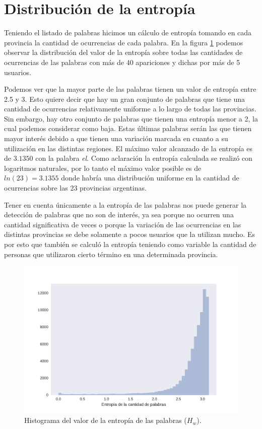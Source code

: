 \section{Distribución de la entropía}
Teniendo el listado de palabras hicimos un cálculo de entropía tomando en cada provincia la cantidad de ocurrencias de cada palabra. En la figura \ref{fig:entropiaPalabras} podemos observar la distribución del valor de la entropía sobre todas las cantidades de ocurrencias de las palabras con más de 40 apariciones y dichas por más de 5 usuarios. 

Podemos ver que la mayor parte de las palabras tienen un valor de entropía entre 2.5 y 3. Esto quiere decir que hay un gran conjunto de palabras que tiene una cantidad de ocurrencias relativamente uniforme a lo largo de todas las provincias. Sin embargo, hay otro conjunto de palabras que tienen una entropía menor a 2, la cual podemos considerar como baja. Estas últimas palabras serán las que tienen mayor interés debido a que tienen una variación marcada en cuanto a su utilización en las distintas regiones. El máximo valor alcanzado de la entropía es de $3.1350$ con la palabra \textit{el}. Como aclaración la entropía calculada se realizó con logaritmos naturales, por lo tanto el máximo valor posible es de  $ln(23) = 3.1355$ donde habría una distribución uniforme en la cantidad de ocurrencias sobre las 23 provincias argentinas.

Tener en cuenta únicamente a la entropía de las palabras nos puede generar la detección de palabras que no son de interés, ya sea porque no ocurren una cantidad significativa de veces o porque la variación de las ocurrencias en las distintas provincias se debe solamente a pocos usuarios que la utilizan mucho. Es por esto que también se calculó la entropía teniendo como variable la cantidad de personas que utilizaron cierto término en una determinada provincia.


\begin{figure}[ht]
\centering
\includegraphics[width=1.0\textwidth]{./images/DistribucionEntropia.pdf}
\caption{Histograma del valor de la entropía de las palabras ($H_w$).} 
\label{fig:entropiaPalabras} 
\end{figure}



